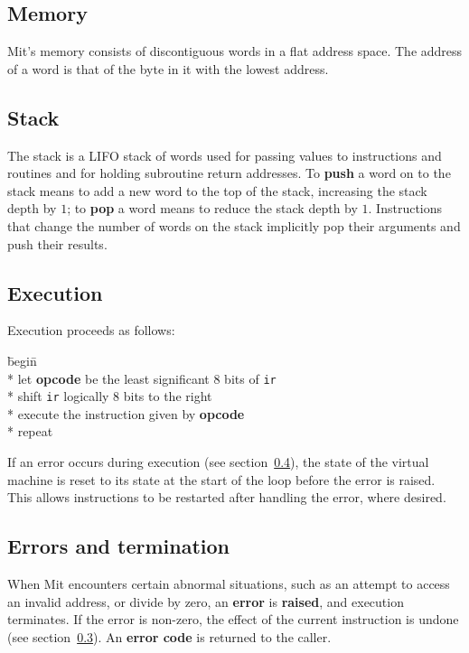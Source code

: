 \documentclass[a4paper]{article}
\begin{document}
\subsection{Memory}

Mit's memory consists of discontiguous words in a flat address space. The address of a word is that of the byte in it with the lowest address.


\subsection{Stack}

The stack is a LIFO stack of words used for passing values to instructions and routines and for holding subroutine return addresses. To {\bf push} a word on to the stack means to add a new word to the top of the stack, increasing the stack depth by $1$; to {\bf pop} a word means to reduce the stack depth by $1$. Instructions that change the number of words on the stack implicitly pop their arguments and push their results.


\subsection{Execution}
\label{execution}

Execution proceeds as follows:

\begin{tabbing}
\hspace{0.5in}\=begin\=\+\+ \\*
let \textbf{opcode} be the least significant $8$ bits of {\tt ir} \\*
shift {\tt ir} logically $8$ bits to the right \\*
execute the instruction given by \textbf{opcode} \- \\*
repeat
\end{tabbing}

If an error occurs during execution (see section~\ref{errors}), the state of the virtual machine is reset to its state at the start of the loop before the error is raised. This allows instructions to be restarted after handling the error, where desired.

\subsection{Errors and termination}
\label{errors}

When Mit encounters certain abnormal situations, such as an attempt to access an invalid address, or divide by zero, an {\bf error} is {\bf raised}, and execution terminates. If the error is non-zero, the effect of the current instruction is undone (see section~\ref{execution}). An {\bf error code} is returned to the caller.
\end{document}
